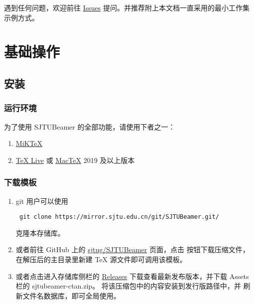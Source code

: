 \documentclass[
    UTF8,
    heading=true,
    12pt,
    a4paper
]{ctexrep}
\def\themename{\textsf{SJTUBeamer}}
\begin{document}
遇到任何问题，欢迎前往
\href{https://github.com/sjtug/SJTUBeamer/issues}
{Issues} 提问。并推荐附上本文档一直采用的最小工作集示例方式。

\setcounter{tocdepth}{0}
\tableofcontents

\part{基础操作}
\chapter{安装}

\section{运行环境}

为了使用 \themename{} 的全部功能，请使用下者之一：
\begin{enumerate}
  \item \href{https://mirrors.sjtug.sjtu.edu.cn/ctan/systems/win32/miktex/setup/windows-x64/}{MiK\TeX{}}
  \item \href{https://mirrors.sjtug.sjtu.edu.cn/ctan/systems/texlive/Images/}
        {\TeX{} Live} 或
        \href{https://mirrors.sjtug.sjtu.edu.cn/ctan/systems/mac/mactex/}
        {Mac\TeX{}} 2019 及以上版本
\end{enumerate}

\section{下载模板}

\begin{enumerate}
  \item git 用户可以使用
        \begin{verbatim} git clone https://mirror.sjtu.edu.cn/git/SJTUBeamer.git/ \end{verbatim}
        克隆本存储库。
  \item 或者前往 GitHub 上的
        \faGithub{}
        \href{https://github.com/sjtug/SJTUBeamer}{sjtug/SJTUBeamer} 页面，点击
        按钮下载压缩文件，在解压后的主目录里新建 \TeX{}
        源文件即可调用该模板。
  \item 或者点击进入存储库侧栏的
        \href{https://github.com/sjtug/SJTUBeamer/releases}{\textsf{Releases}}
        下载查看最新发布版本，并下载 \textsf{Assets} 栏的
        \textsf{sjtubeamer-ctan.zip}。
        将该压缩包中的内容安装到发行版路径中，并
        刷新文件名数据库，即可全局使用。
\end{enumerate}
\end{document}
